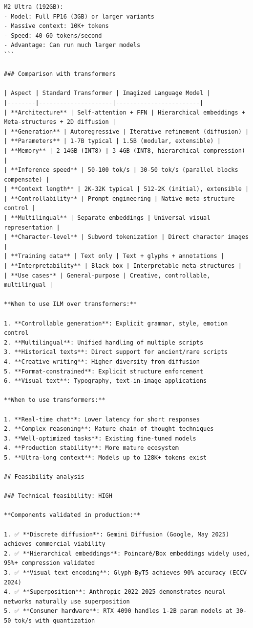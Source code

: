 \documentclass[11pt]{article}
\begin{document}
\begin{verbatim}
M2 Ultra (192GB):
- Model: Full FP16 (3GB) or larger variants
- Massive context: 10K+ tokens
- Speed: 40-60 tokens/second
- Advantage: Can run much larger models
```

### Comparison with transformers

| Aspect | Standard Transformer | Imagized Language Model |
|--------|---------------------|------------------------|
| **Architecture** | Self-attention + FFN | Hierarchical embeddings + Meta-structures + 2D diffusion |
| **Generation** | Autoregressive | Iterative refinement (diffusion) |
| **Parameters** | 1-7B typical | 1.5B (modular, extensible) |
| **Memory** | 2-14GB (INT8) | 3-4GB (INT8, hierarchical compression) |
| **Inference speed** | 50-100 tok/s | 30-50 tok/s (parallel blocks compensate) |
| **Context length** | 2K-32K typical | 512-2K (initial), extensible |
| **Controllability** | Prompt engineering | Native meta-structure control |
| **Multilingual** | Separate embeddings | Universal visual representation |
| **Character-level** | Subword tokenization | Direct character images |
| **Training data** | Text only | Text + glyphs + annotations |
| **Interpretability** | Black box | Interpretable meta-structures |
| **Use cases** | General-purpose | Creative, controllable, multilingual |

**When to use ILM over transformers:**

1. **Controllable generation**: Explicit grammar, style, emotion control
2. **Multilingual**: Unified handling of multiple scripts
3. **Historical texts**: Direct support for ancient/rare scripts
4. **Creative writing**: Higher diversity from diffusion
5. **Format-constrained**: Explicit structure enforcement
6. **Visual text**: Typography, text-in-image applications

**When to use transformers:**

1. **Real-time chat**: Lower latency for short responses
2. **Complex reasoning**: Mature chain-of-thought techniques
3. **Well-optimized tasks**: Existing fine-tuned models
4. **Production stability**: More mature ecosystem
5. **Ultra-long context**: Models up to 128K+ tokens exist

## Feasibility analysis

### Technical feasibility: HIGH

**Components validated in production:**

1. ✅ **Discrete diffusion**: Gemini Diffusion (Google, May 2025) achieves commercial viability
2. ✅ **Hierarchical embeddings**: Poincaré/Box embeddings widely used, 95%+ compression validated
3. ✅ **Visual text encoding**: Glyph-ByT5 achieves 90% accuracy (ECCV 2024)
4. ✅ **Superposition**: Anthropic 2022-2025 demonstrates neural networks naturally use superposition
5. ✅ **Consumer hardware**: RTX 4090 handles 1-2B param models at 30-50 tok/s with quantization


\end{verbatim}
\end{document}
